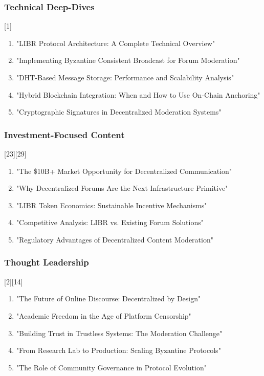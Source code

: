\documentclass[12pt,a4paper]{article}
\begin{document}
\subsubsection{Technical Deep-Dives}[1]
\begin{enumerate}
    \item "LIBR Protocol Architecture: A Complete Technical Overview"
    \item "Implementing Byzantine Consistent Broadcast for Forum Moderation"
    \item "DHT-Based Message Storage: Performance and Scalability Analysis"
    \item "Hybrid Blockchain Integration: When and How to Use On-Chain Anchoring"
    \item "Cryptographic Signatures in Decentralized Moderation Systems"
\end{enumerate}

\subsubsection{Investment-Focused Content}[23][29]
\begin{enumerate}
    \item "The \$10B+ Market Opportunity for Decentralized Communication"
    \item "Why Decentralized Forums Are the Next Infrastructure Primitive"
    \item "LIBR Token Economics: Sustainable Incentive Mechanisms"
    \item "Competitive Analysis: LIBR vs. Existing Forum Solutions"
    \item "Regulatory Advantages of Decentralized Content Moderation"
\end{enumerate}

\subsubsection{Thought Leadership}[2][14]
\begin{enumerate}
    \item "The Future of Online Discourse: Decentralized by Design"
    \item "Academic Freedom in the Age of Platform Censorship"
    \item "Building Trust in Trustless Systems: The Moderation Challenge"
    \item "From Research Lab to Production: Scaling Byzantine Protocols"
    \item "The Role of Community Governance in Protocol Evolution"
\end{enumerate}
\end{document}
